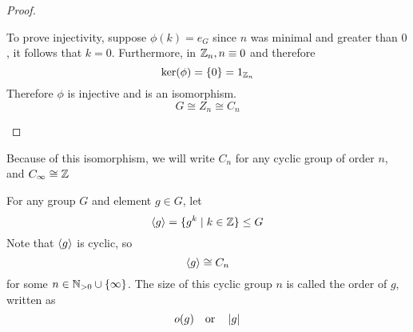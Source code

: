 \documentclass{article}
\begin{document}
\begin{proof}
\begin{enumerate}[cases]
        To prove injectivity, suppose $\phi(k) = e_G$ since $n$ was minimal and greater than $0$, it follows that $k = 0$. Furthermore, in $\mathbb{Z}_n, n \equiv 0$ and therefore
        \[
            \ker(\phi) = \{0\} = 1_{\mathbb{Z}_n}  
        \]
        Therefore $\phi$ is injective and is an isomorphism.
        \[
            G \cong Z_n \cong C_n  
        \]
    \end{enumerate}
\end{proof}

\begin{remark}
    Because of this isomorphism, we will write $C_n$ for any cyclic group of order $n$, and $C_\infty \cong \mathbb{Z}$ 
\end{remark}

\begin{defi}
    For any group $G$ and element $g \in G$, let
    \[
        \left\langle g\right\rangle = \{g^k \mid k \in \mathbb{Z}\} \leq G  
    \]
    Note that $\left\langle g\right\rangle$ is cyclic, so
    \[
        \left\langle g\right\rangle \cong C_n    
    \]
    for some $n \in \mathbb{N}_{>0} \cup \{\infty\}$. The size of this cyclic group $n$ is called the order of $g$, written as
    \[
        o(g) \quad \text{or} \quad \left\lvert g\right\rvert  
    \]
\end{defi}

\end{document}
